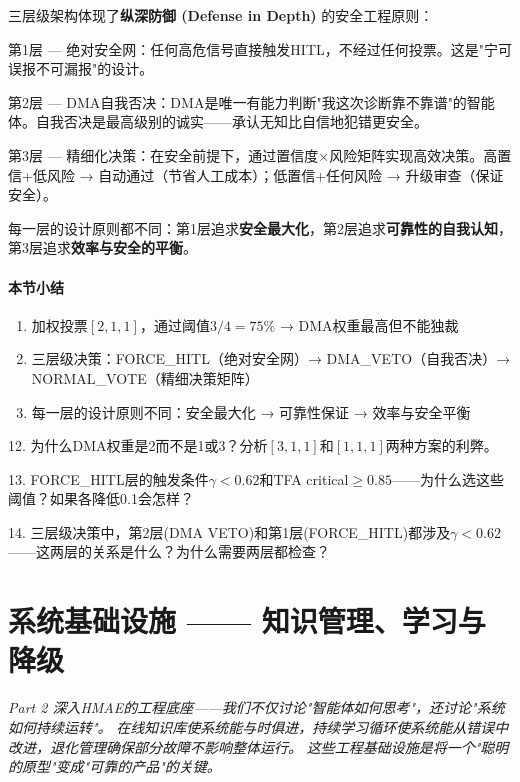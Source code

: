\documentclass[11pt,a4paper]{ctexart}
\begin{document}
\begin{deepbox}
三层级架构体现了\textbf{纵深防御 (Defense in Depth)} 的安全工程原则：

第1层 — 绝对安全网：任何高危信号直接触发HITL，不经过任何投票。这是"宁可误报不可漏报"的设计。

第2层 — DMA自我否决：DMA是唯一有能力判断"我这次诊断靠不靠谱"的智能体。自我否决是最高级别的诚实——承认无知比自信地犯错更安全。

第3层 — 精细化决策：在安全前提下，通过置信度×风险矩阵实现高效决策。高置信+低风险 → 自动通过（节省人工成本）；低置信+任何风险 → 升级审查（保证安全）。

每一层的设计原则都不同：第1层追求\textbf{安全最大化}，第2层追求\textbf{可靠性的自我认知}，第3层追求\textbf{效率与安全的平衡}。
\end{deepbox}

\subsection{本节小结}

\begin{enumerate}[nosep]
\item 加权投票$[2,1,1]$，通过阈值$3/4=75\%$ → DMA权重最高但不能独裁
\item 三层级决策：FORCE\_HITL（绝对安全网）→ DMA\_VETO（自我否决）→ NORMAL\_VOTE（精细决策矩阵）
\item 每一层的设计原则不同：安全最大化 → 可靠性保证 → 效率与安全平衡
\end{enumerate}

\begin{exerbox}[思考题 12--14]
12. 为什么DMA权重是2而不是1或3？分析$[3,1,1]$和$[1,1,1]$两种方案的利弊。

13. FORCE\_HITL层的触发条件$\gamma < 0.62$和TFA critical$\geq 0.85$——为什么选这些阈值？如果各降低0.1会怎样？

14. 三层级决策中，第2层(DMA VETO)和第1层(FORCE\_HITL)都涉及$\gamma < 0.62$——这两层的关系是什么？为什么需要两层都检查？
\end{exerbox}

\newpage

\part{系统基础设施 —— 知识管理、学习与降级}\vspace{18pt}
\vspace{6pt}
\begin{center}
\small
\textit{Part 2 深入HMAE的工程底座——我们不仅讨论"智能体如何思考"，还讨论"系统如何持续运转"。}
\textit{在线知识库使系统能与时俱进，持续学习循环使系统能从错误中改进，退化管理确保部分故障不影响整体运行。}
\textit{这些工程基础设施是将一个"聪明的原型"变成"可靠的产品"的关键。}
\end{center}
\vspace{12pt}
\end{document}
